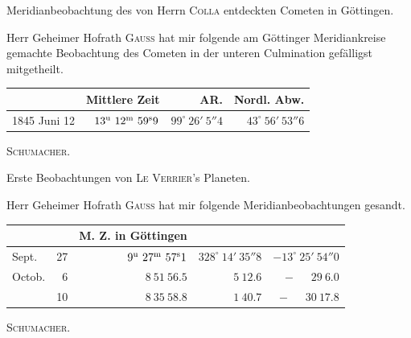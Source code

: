 \par{}\bigskip
\hypertarget{native-476-middle}{}

\begin{center}Meridianbeobachtung des von Herrn \textsc{Colla} entdeckten Cometen in Göttingen.\end{center}

Herr Geheimer Hofrath \textsc{Gauss} hat mir folgende am Göttinger Meridiankreise gemachte Beobachtung des Cometen in der unteren Culmination gefälligst mitgetheilt.

\begin{center}
\setlength{\tabcolsep}{5pt}
\begin{tabular}{l|r|r|r}
 & Mittlere Zeit & AR. & Nordl. Abw. \\
\hline
1845 Juni 12 & $13^{\rm u}\ 12^{\rm m}\ 59^{\rm s}9$ & $99^\circ\ 26'\ 5''4$ & $43^\circ\ 56'\ 53''6$ \\
\end{tabular}
\end{center}
\begin{flushright}\textsc{Schumacher}.\end{flushright}

\par{}\bigskip
\hypertarget{native-476-planet}{}

\begin{center}Erste Beobachtungen von \textsc{Le Verrier}'s Planeten.\end{center}

Herr Geheimer Hofrath \textsc{Gauss} hat mir folgende Meridianbeobachtungen gesandt.

\begin{center}
\setlength{\tabcolsep}{5pt}
\begin{tabular}{lr|r|r|r}
\multicolumn{2}{l|}{} & M. Z. in Göttingen & & \\
\hline
Sept. & 27 & $9^{\rm u}\ 27^{\rm m}\ 57^{\rm s}1$ & $328^\circ\ 14'\ 35''8$ & $-13^\circ\ 25'\ 54''0$ \\
Octob. & 6 & $8\ 51\ 56.5$ & $5\ 12.6$ & $-\phantom{13^\circ\ }29\ 6.0$ \\
 & 10 & $8\ 35\ 58.8$ & $1\ 40.7$ & $-\phantom{13^\circ\ }30\ 17.8$ \\
\end{tabular}
\end{center}
\begin{flushright}\textsc{Schumacher}.\end{flushright}

